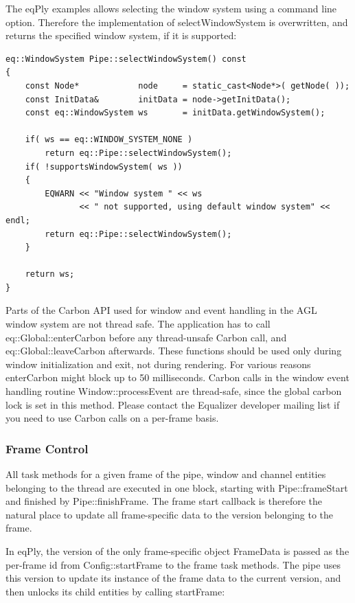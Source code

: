 \documentclass[10pt,a4]{scrartcl}
\begin{document}
The \textsf{eqPly} examples allows selecting the window system using a
command line option. Therefore the implementation of
\textsf{selectWindowSystem} is overwritten, and returns the specified
window system, if it is supported:

{\footnotesize\begin{lstlisting}
eq::WindowSystem Pipe::selectWindowSystem() const
{
    const Node*            node     = static_cast<Node*>( getNode( ));
    const InitData&        initData = node->getInitData();
    const eq::WindowSystem ws       = initData.getWindowSystem();

    if( ws == eq::WINDOW_SYSTEM_NONE )
        return eq::Pipe::selectWindowSystem();
    if( !supportsWindowSystem( ws ))
    {
        EQWARN << "Window system " << ws 
               << " not supported, using default window system" << endl;
        return eq::Pipe::selectWindowSystem();
    }

    return ws;
}
\end{lstlisting}}%

Parts of the Carbon API used for window and event handling in the AGL
window system are not thread safe. The application has to call
\textsf{eq::Global::enterCarbon} before any thread-unsafe Carbon call,
and \textsf{eq::Global::leaveCarbon} afterwards. These functions should
be used only during window initialization and exit, not during
rendering. For various reasons \textsf{enterCarbon} might block up to 50
milliseconds. Carbon calls in the window event handling routine
\textsf{Window::processEvent} are thread-safe, since the global carbon
lock is set in this method. Please contact the Equalizer developer
mailing list if you need to use Carbon calls on a per-frame basis.

\subsubsection{Frame Control}

All task methods for a given frame of the pipe, window and channel
entities belonging to the thread are executed in one block, starting
with \textsf{Pipe::frameStart} and finished by
\textsf{Pipe::finishFrame}. The frame start callback is therefore the
natural place to update all frame-specific data to the version belonging
to the frame. 

In \textsf{eqPly}, the version of the only frame-specific object
\textsf{FrameData} is passed as the per-frame id from
\textsf{Config::startFrame} to the frame task methods. The pipe uses
this version to update its instance of the frame data to the current
version, and then unlocks its child entities by calling
\textsf{startFrame}:
\end{document}
